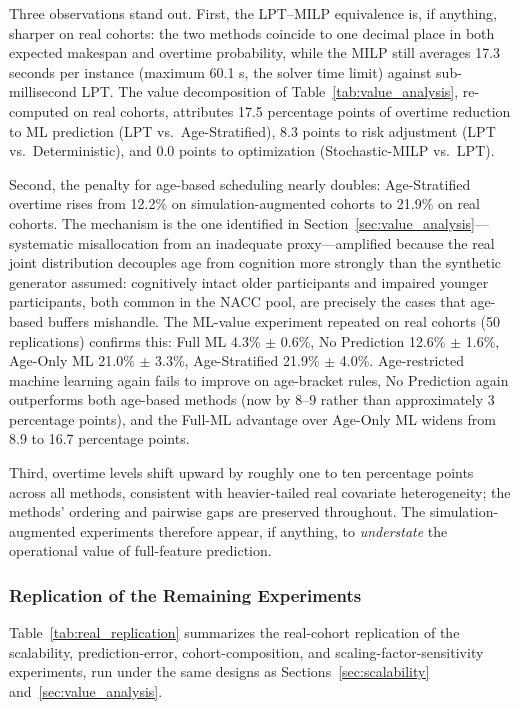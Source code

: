 \documentclass[11pt,a4paper]{article}
\begin{document}
{Three observations stand out. First, the LPT--MILP equivalence is, if anything, sharper on real cohorts: the two methods coincide to one decimal place in both expected makespan and overtime probability, while the MILP still averages 17.3 seconds per instance (maximum 60.1 s, the solver time limit) against sub-millisecond LPT. The value decomposition of Table~\ref{tab:value_analysis}, re-computed on real cohorts, attributes 17.5 percentage points of overtime reduction to ML prediction (LPT vs.\ Age-Stratified), 8.3 points to risk adjustment (LPT vs.\ Deterministic), and 0.0 points to optimization (Stochastic-MILP vs.\ LPT).

Second, the penalty for age-based scheduling nearly doubles: Age-Stratified overtime rises from 12.2\% on simulation-augmented cohorts to 21.9\% on real cohorts. The mechanism is the one identified in Section~\ref{sec:value_analysis}---systematic misallocation from an inadequate proxy---amplified because the real joint distribution decouples age from cognition more strongly than the synthetic generator assumed: cognitively intact older participants and impaired younger participants, both common in the NACC pool, are precisely the cases that age-based buffers mishandle. The ML-value experiment repeated on real cohorts (50 replications) confirms this: Full ML 4.3\% $\pm$ 0.6\%, No Prediction 12.6\% $\pm$ 1.6\%, Age-Only ML 21.0\% $\pm$ 3.3\%, Age-Stratified 21.9\% $\pm$ 4.0\%. Age-restricted machine learning again fails to improve on age-bracket rules, No Prediction again outperforms both age-based methods (now by 8--9 rather than approximately 3 percentage points), and the Full-ML advantage over Age-Only ML widens from 8.9 to 16.7 percentage points.

Third, overtime levels shift upward by roughly one to ten percentage points across all methods, consistent with heavier-tailed real covariate heterogeneity; the methods' ordering and pairwise gaps are preserved throughout. The simulation-augmented experiments therefore appear, if anything, to \textit{understate} the operational value of full-feature prediction.

\subsubsection{Replication of the Remaining Experiments}

Table~\ref{tab:real_replication} summarizes the real-cohort replication of the scalability, prediction-error, cohort-composition, and scaling-factor-sensitivity experiments, run under the same designs as Sections~\ref{sec:scalability} and~\ref{sec:value_analysis}.

}
\end{document}
